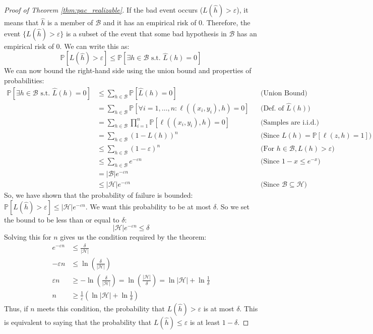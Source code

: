 \documentclass[11pt]{article}
\theoremstyle{plain} %
\begin{document}
\begin{proof}[Proof of Theorem \ref{thm:pac_realizable}]
If the bad event occurs ($L(\hat{h}) > \varepsilon$), it means that $\hat{h}$ is a member of $\mathcal{B}$ and it has an empirical risk of 0. Therefore, the event $\{L(\hat{h}) > \varepsilon\}$ is a subset of the event that some bad hypothesis in $\mathcal{B}$ has an empirical risk of 0. We can write this as:
\[
    \mathbb{P}[L(\hat{h}) > \varepsilon] \leq \mathbb{P}[\exists h \in \mathcal{B} \text{ s.t. } \widehat{L}(h) = 0]
\]
We can now bound the right-hand side using the union bound and properties of probabilities:
\begin{align*}
    \mathbb{P}[\exists h \in \mathcal{B} \text{ s.t. } \widehat{L}(h) = 0] 
    &\leq \sum_{h \in \mathcal{B}} \mathbb{P}[\widehat{L}(h) = 0] &&\text{(Union Bound)}\\
    &= \sum_{h \in \mathcal{B}} \mathbb{P}[\forall i=1,\dots,n : \ell((x_i,y_i),h) = 0] &&\text{(Def. of } \widehat{L}(h)) \\
    &= \sum_{h \in \mathcal{B}} \prod_{i=1}^{n} \mathbb{P}[\ell((x_i,y_i),h) = 0] &&\text{(Samples are i.i.d.)} \\
    &= \sum_{h \in \mathcal{B}} (1 - L(h))^n &&\text{(Since } L(h) = \mathbb{P}[\ell(z,h)=1]) \\
    &\leq \sum_{h \in \mathcal{B}} (1 - \varepsilon)^n &&\text{(For } h \in \mathcal{B}, L(h) > \varepsilon) \\
    &\leq \sum_{h \in \mathcal{B}} e^{-\varepsilon n} &&\text{(Since } 1-x \leq e^{-x}) \\
    &= |\mathcal{B}| e^{-\varepsilon n} \\
    &\leq |\mathcal{H}| e^{-\varepsilon n} &&\text{(Since } \mathcal{B} \subseteq \mathcal{H})
\end{align*}
So, we have shown that the probability of failure is bounded: $\mathbb{P}[L(\hat{h}) > \varepsilon] \leq |\mathcal{H}|e^{-\varepsilon n}$.
We want this probability to be at most $\delta$. So we set the bound to be less than or equal to $\delta$:
\[
    |\mathcal{H}|e^{-\varepsilon n} \leq \delta
\]
Solving this for $n$ gives us the condition required by the theorem:
\begin{align*}
    e^{-\varepsilon n} &\leq \frac{\delta}{|\mathcal{H}|} \\
    -\varepsilon n &\leq \ln\left(\frac{\delta}{|\mathcal{H}|}\right) \\
    \varepsilon n &\geq -\ln\left(\frac{\delta}{|\mathcal{H}|}\right) = \ln\left(\frac{|\mathcal{H}|}{\delta}\right) = \ln|\mathcal{H}| + \ln\frac{1}{\delta} \\
    n &\geq \frac{1}{\varepsilon}\left(\ln|\mathcal{H}| + \ln\frac{1}{\delta}\right)
\end{align*}
Thus, if $n$ meets this condition, the probability that $L(\hat{h}) > \varepsilon$ is at most $\delta$. This is equivalent to saying that the probability that $L(\hat{h}) \leq \varepsilon$ is at least $1-\delta$.
\end{proof}
\end{document}
